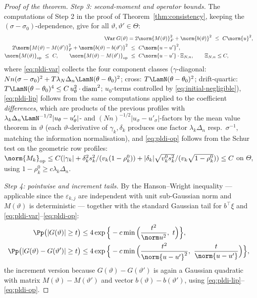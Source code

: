 \begin{proof}[Proof of the theorem]
\emph{Step 3: second-moment and operator bounds.}
The computations of Step 2 in the proof of Theorem~\ref{thm:consistency}, keeping the
$(\sigma-\sigma_0)$-dependence, give for all $\vartheta,\vartheta'\in\Theta$:
\begin{align}
 \Var\,G(\vartheta)
 &=2\norm{M(\vartheta)}_F^2+\norm{b(\vartheta)}^2
 \ \le\ C\norm{u}^2,\label{eq:pldi-var}\\
 2\norm{M(\vartheta)-M(\vartheta')}_F^2
 +\norm{b(\vartheta)-b(\vartheta')}^2
 &\ \le\ C\norm{u-u'}^2,\label{eq:pldi-lip}\\
 \norm{M(\vartheta)}_{\mathrm{op}}\ \le\ C,
 \qquad
 \norm{M(\vartheta)-M(\vartheta')}_{\mathrm{op}}
 &\ \le\ C\norm{u-u'}\cdot\Xi_{N,n},
 \qquad \Xi_{N,n}\le C,\label{eq:pldi-op}
\end{align}
where \eqref{eq:pldi-var} collects the four component classes
($\gamma$-diagonal: $Nn(\sigma-\sigma_0)^2+T\lambda_N\Delta_n\LamN
(\theta-\theta_0)^2$; cross: $T\LamN(\theta-\theta_0)^2$; drift-quartic:
$T\LamN(\theta-\theta_0)^4\le C\,u_\theta^2\cdot\mathrm{diam}^2$;
$u_0$-terms controlled by \eqref{eq:initial-negligible}), \eqref{eq:pldi-lip}
follows from the same computations applied to the coefficient
\emph{differences}, which are products of the previous profiles with
$\lambda_k\Delta_n\LamN^{-1/2}|u_\theta-u'_\theta|$- and
$(Nn)^{-1/2}|u_\sigma-u'_\sigma|$-factors by the mean value theorem in
$\vartheta$ (each $\vartheta$-derivative of $\gamma_k,\delta_k$ produces one
factor $\lambda_k\Delta_n$ resp.\ $\sigma^{-1}$, matching the information
normalisation), and \eqref{eq:pldi-op} follows from the Schur test on the geometric row profiles:
$\norm{M_k}_{\mathrm{op}}\le C(|\gamma_k|
+\delta_k^2s_k^2/(v_k(1-\rho^0_k))
+|\delta_k|\sqrt{v^0_ks_k^2}/(v_k\sqrt{1-\rho^0_k}))\le C$ on $\Theta$,
using $1-\rho^0_k\ge c\lambda_k\Delta_n$.

\emph{Step 4: pointwise and increment tails.}
By the Hanson--Wright inequality
\citep[Theorem~1.1]{RudelsonVershynin2013} — applicable since the
$\varepsilon_{k,j}$ are independent with unit sub-Gaussian norm and
$M(\vartheta)$ is deterministic — together with the standard Gaussian tail
for $b^\top\xi$ and \eqref{eq:pldi-var}--\eqref{eq:pldi-op}:
\begin{align}
 \Pp\big(|G(\vartheta)|\ge t\big)
 &\le4\exp\Big\{-c\min\Big(\frac{t^2}{\norm u^2},\ t\Big)\Big\},
 \label{eq:pldi-hw}\\
 \Pp\big(|G(\vartheta)-G(\vartheta')|\ge t\big)
 &\le4\exp\Big\{-c\min\Big(\frac{t^2}{\norm{u-u'}^2},\
 \frac{t}{\norm{u-u'}}\Big)\Big\},\label{eq:pldi-hw-inc}
\end{align}
the increment version because $G(\vartheta)-G(\vartheta')$ is again a
Gaussian quadratic with matrix $M(\vartheta)-M(\vartheta')$ and vector
$b(\vartheta)-b(\vartheta')$, using \eqref{eq:pldi-lip}--\eqref{eq:pldi-op}.


\end{proof}

